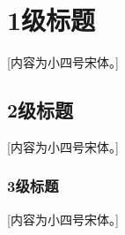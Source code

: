  \setlength{\baselineskip}{20pt}
\chapter{1级标题}
\label{cha:chap4}

[内容为小四号宋体。] 

\section{2级标题}

[内容为小四号宋体。] 

\subsection{3级标题}

[内容为小四号宋体。] 